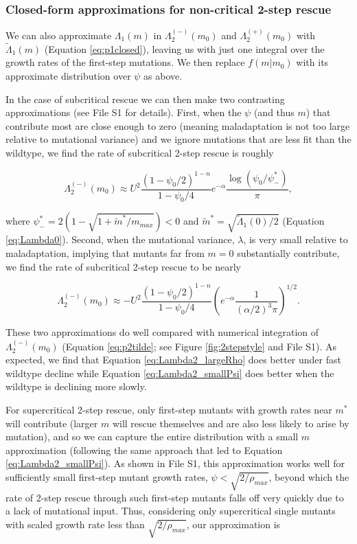\documentclass[9pt,twocolumn,twoside,lineno]{gsajnl}
\begin{document}
\subsubsection{Closed-form approximations for non-critical 2-step rescue}

We can also approximate $\Lambda_1(m)$ in $\Lambda_2^{(-)}(m_0)$ and $\Lambda_2^{(+)}(m_0)$ with $\tilde{\Lambda}_1(m)$ (Equation \ref{eq:p1closed}), leaving us with just one integral over the growth rates of the first-step mutations.
We then replace $f(m|m_0)$ with its approximate distribution over $\psi$ as above.

In the case of subcritical rescue we can then make two contrasting approximations (see File S1 for details).
First, when the $\psi$ (and thus $m$) that contribute most are close enough to zero (meaning maladaptation is not too large relative to mutational variance) and we ignore mutations that are less fit than the wildtype, we find the rate of subcritical 2-step rescue is roughly

\begin{equation}\label{eq:Lambda2_smallPsi}
\Lambda_2^{(-)}(m_0) \approx U^2 \frac{(1-\psi_0/2)^{1-n}}{1-\psi_0/4} e^{-\alpha} \frac{\log(\psi_0 / \psi^*_{-})}{\pi},
\end{equation}

\noindent where $\psi^*_{-} = 2(1-\sqrt{1 + \tilde{m}^*/m_{max}})<0$ and $\tilde{m}^* = \sqrt{\tilde{\Lambda}_1(0)/2}$ (Equation \ref{eq:Lambda0}).
Second, when the mutational variance, $\lambda$, is very small relative to maladaptation, implying that mutants far from $m=0$ substantially contribute, we find the rate of subcritical 2-step rescue to be nearly

\begin{equation}\label{eq:Lambda2_largeRho}
\Lambda_2^{(-)}(m_0) \approx -U^2 \frac{(1-\psi_0/2)^{1-n}}{1-\psi_0/4} \left(  e^{-\alpha} \frac{1}{(\alpha/2)^3 \pi} \right)^{1/2}.
\end{equation}

\noindent These two approximations do well compared with numerical integration of $\Lambda_2^{(-)}(m_0)$ (Equation \ref{eq:p2tilde}; see Figure \ref{fig:2stepstyle} and File S1).
As expected, we find that Equation \ref{eq:Lambda2_largeRho} does better under fast wildtype decline while Equation \ref{eq:Lambda2_smallPsi} does better when the wildtype is declining more slowly. 

For supercritical 2-step rescue, only first-step mutants with growth rates near $m^*$ will contribute (larger $m$ will rescue themselves and are also less likely to arise by mutation), and so we can capture the entire distribution with a small $m$ approximation (following the same approach that led to Equation \ref{eq:Lambda2_smallPsi}).
As shown in File S1, this approximation works well for sufficiently small first-step mutant growth rates, $\psi<\sqrt{2/\rho_{max}}$, beyond which the rate of 2-step rescue through such first-step mutants falls off very quickly due to a lack of mutational input.
Thus, considering only supercritical single mutants with scaled growth rate less than $\sqrt{2/\rho_{max}}$, our approximation is
\end{document}
